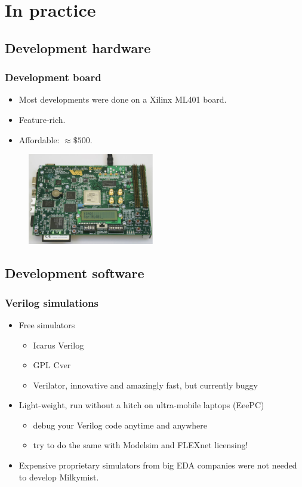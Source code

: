 \documentclass{beamer}
\begin{document}
\section{In practice}
\frame
{
  \begin{center}
  \end{center}
}

\subsection{Development hardware}
\frame
{
  \frametitle{Development board}
  \begin{itemize}
  \item Most developments were done on a Xilinx ML401 board.
  \item Feature-rich.
  \item Affordable: $\approx\$500$.
  \end{itemize}
  \begin{figure}[H]
  \includegraphics[height=40mm]{ml401.eps}
  \end{figure}
}


\subsection{Development software}
\frame
{
  \frametitle{Verilog simulations}
  \begin{itemize}
  \item Free simulators
  \begin{itemize}
  \item Icarus Verilog
  \item GPL Cver
  \item Verilator, innovative and amazingly fast, but currently buggy
  \end{itemize}
  \item Light-weight, run without a hitch on ultra-mobile laptops (EeePC)
  \begin{itemize}
  \item debug your Verilog code anytime and anywhere
  \item try to do the same with Modelsim and FLEXnet licensing!
  \end{itemize}
  \item Expensive proprietary simulators from big EDA companies were not needed to develop Milkymist.
  \end{itemize}
}
\end{document}
